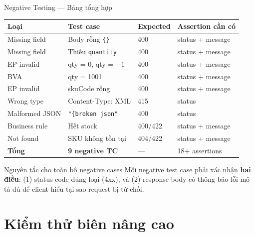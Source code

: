 \documentclass[aspectratio=169,10pt]{beamer}
\begin{document}
\begin{frame}{Negative Testing --- Bảng tổng hợp}
  \begin{center}
  \small
  \begin{tabular}{p{2.2cm}p{3.5cm}p{2cm}p{3cm}}
    \toprule
    \textbf{Loại} & \textbf{Test case} & \textbf{Expected} & \textbf{Assertion cần có} \\
    \midrule
    Missing field & Body rỗng \texttt{\{\}} & 400 & status + message \\
    Missing field & Thiếu \texttt{quantity} & 400 & status + message \\
    EP invalid & qty = 0, qty = $-1$ & 400 & status + message \\
    BVA & qty = 1001 & 400 & status + message \\
    EP invalid & skuCode rỗng & 400 & status + message \\
    Wrong type & Content-Type: XML & 415 & status \\
    Malformed JSON & \texttt{"\{broken json"} & 400 & status \\
    Business rule & Hết stock & 400/422 & status + message \\
    Not found & SKU không tồn tại & 404/422 & status + message \\
    \midrule
    \textbf{Tổng} & \textbf{9 negative TC} & --- & 18+ assertions \\
    \bottomrule
  \end{tabular}
  \end{center}

  \vspace{0.3em}
  \begin{block}{Nguyên tắc cho toàn bộ negative cases}
    Mỗi negative test case phải xác nhận \textbf{hai điều}:
    (1) status code đúng loại (4xx), và (2) response body
    có thông báo lỗi mô tả đủ để client hiểu tại sao request bị từ chối.
  \end{block}
\end{frame}

\section{Kiểm thử biên nâng cao}
\end{document}
